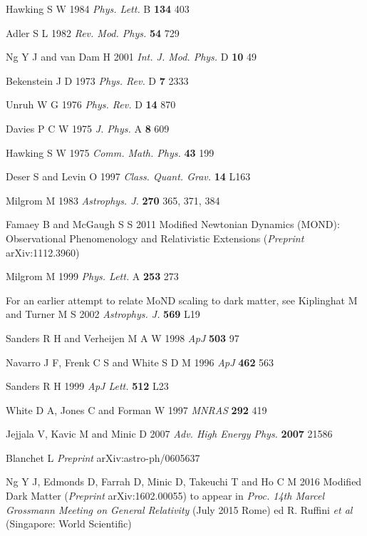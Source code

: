 \documentclass[a4paper]{jpconf}
\begin{document}
\begin{thebibliography}{50}
Hawking S W 1984 {\it Phys. Lett.} B {\bf 134} 403 

Adler S L 1982 {\it Rev. Mod. Phys.} {\bf 54} 729

Ng Y J and van Dam H 2001 {\it Int. J. Mod. Phys.} D {\bf 10} 49 




Bekenstein J D 1973 {\it Phys. Rev.} D {\bf 7} 2333

Unruh W G 1976 {\it Phys. Rev.} D {\bf 14} 870

Davies P C W 1975 {\it J. Phys.} A {\bf 8} 609


Hawking S W 1975 {\it Comm. Math. Phys.} {\bf 43} 199


Deser S and Levin O 1997 {\it Class. Quant. Grav.} {\bf 14}  L163


Milgrom M 1983 {\it Astrophys. J.} {\bf 270} 365, 371, 384

Famaey B and McGaugh S S 2011
Modified Newtonian Dynamics (MOND): Observational 
Phenomenology and Relativistic Extensions
({\it Preprint} arXiv:1112.3960)


Milgrom M 1999 {\it Phys. Lett.} A {\bf 253} 273

For an earlier attempt to relate MoND scaling to dark matter, see
Kiplinghat M and Turner M S 2002 {\it Astrophys. J.} {\bf 569} L19




Sanders R H and Verheijen M A W 1998 {\it ApJ} {\bf 503} 97 

Navarro J F, Frenk C S and White S D M 1996 {\it ApJ} {\bf 462} 563 

Sanders R H 1999 {\it ApJ Lett.} {\bf 512} L23 

White D A, Jones C and Forman W 1997 {\it MNRAS} {\bf 292} 419 




Jejjala V, Kavic M and Minic D 2007 {\it Adv. High Energy Phys.}
{\bf 2007} 21586 

Blanchet L {\it Preprint} arXiv:astro-ph/0605637

Ng Y J, Edmonds D, Farrah D, Minic D, Takeuchi T and
Ho C M 2016
Modified Dark Matter  
({\it Preprint} arXiv:1602.00055)
to appear in {\it Proc. 14th Marcel Grossmann Meeting on
General Relativity} (July 2015 Rome) ed R. Ruffini {\it et al}
(Singapore: World Scientific)

\end{thebibliography}
%
\end{document}
